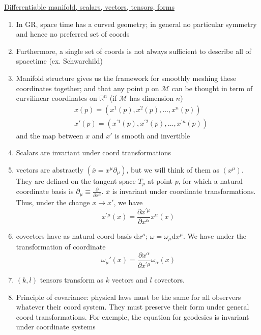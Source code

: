 \documentclass[a4paper]{book}
\theoremstyle{definition}
\theoremstyle{remark}
\begin{document}
\underline{Differentiable manifold, scalars, vectors, tensors, forms}
\begin{enumerate}
    \item In GR, space time has a curved geometry; in general no particular symmetry and hence no preferred set of coords 
    \item Furthermore, a single set of coords is not always sufficient to describe all of spacetime (ex. Schwarchild)
    \item Manifold structure gives us the framework for smoothly meshing these coordinates together; and that any point $p$ on $\mathcal{M}$ can be thought in term of curvilinear coordinates on $\mathbb{R}^n$ (if $\mathcal{M}$ has dimension $n$)
    \begin{equation}
        \begin{aligned}
            &x(p) = (x^1(p), x^2(p), \dots, x^n(p)) \\
            &x'(p) = (x^{'1}(p), x^{'2}(p), \dots, x^{'n}(p)) 
        \end{aligned}
    \end{equation}
    and the map between $x$ and $x'$ is smooth and invertible
    \item  Scalars are invariant under coord transformations 
    \item vectors are abstractly $(\bar{x} = x^\mu\partial_\mu)$, but we will think of them as $(x^\mu)$. They are defined on the tangent space $T_p$ at point $p$, for which a natural coordinate basis is $\partial_\mu \equiv \frac{\partial}{\partial x^\mu}$. $\bar{x}$ is invariant under coordinate transformations. Thus, under the change $x \rightarrow x'$, we have 
    \begin{equation}
        x^{'\mu}(x) = \frac{\partial x^{'\mu}}{\partial x^\alpha} x^\alpha(x)
    \end{equation}
    \item covectors have as natural coord basis $\text{d}x^\mu$; $\omega = \omega_\mu \text{d}x^\mu$. We have under the transformation of coordinate 
    \begin{equation}
        \omega_\mu'(x) = \frac{\partial x^\alpha}{\partial x^{'\mu}}\omega_\alpha(x)
    \end{equation}
    \item $(k, l)$ tensors transform as $k$ vectors and $l$ covectors. 
    \item Principle of covariance: physical laws must be the same for all observers whatever their coord system. They must preserve their form under general coord transformations. For exemple, the equation for geodesics is invariant under coordinate systems 

\end{enumerate}
\end{document}
